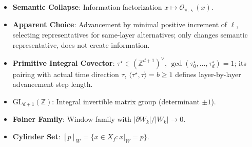 \documentclass[11pt]{article}
\theoremstyle{definition}
\theoremstyle{remark}
\begin{document}
\begin{itemize}
\item \textbf{Semantic Collapse}: Information factorization \( x \mapsto \mathcal{O}_{\pi, \varsigma}(x) \).
\item \textbf{Apparent Choice}: Advancement by minimal positive increment of \( \ell \), selecting representatives for same-layer alternatives; only changes semantic representative, does not create information.
\item \textbf{Primitive Integral Covector}: \( \tau^\star \in (\mathbb{Z}^{d+1})^\vee \), \( \gcd(\tau^\star_0, \ldots, \tau^\star_d) = 1 \); its pairing with actual time direction \( \tau \), \( \langle \tau^\star, \tau \rangle = b \geq 1 \) defines layer-by-layer advancement step length.
\item \( \mathrm{GL}_{d+1}(\mathbb{Z}) \): Integral invertible matrix group (determinant \( \pm 1 \)).
\item \textbf{Følner Family}: Window family with \( |\partial W_k| / |W_k| \to 0 \).
\item \textbf{Cylinder Set}: \( [p]_W = \{x \in X_f : x|_W = p\} \).
\end{itemize}
\end{document}
